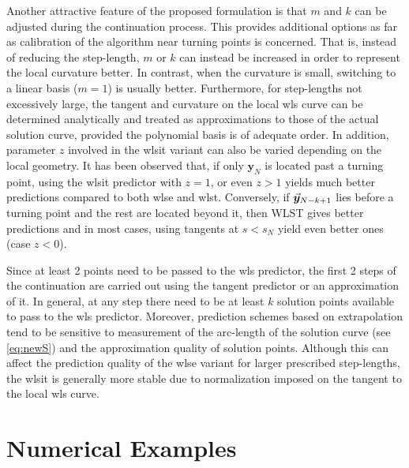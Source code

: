 Another attractive feature of the proposed formulation is that $m$ and $k$ can
be adjusted during the continuation process. This provides additional options 
as far as calibration of the algorithm near turning
points is concerned. That is, instead of reducing the step-length, $m$ or $k$
can instead be increased in order to represent the local curvature better. In
contrast, when the curvature is small, switching to a linear basis ($m=1$) is
usually better.
Furthermore, for step-lengths not excessively large, the tangent and curvature 
on the local \acrshort{wls} curve can be determined analytically and treated as
approximations to those of the actual solution curve, provided the polynomial
basis is of adequate order. In addition, parameter $z$ involved in the 
\acrshort{wlsit}
variant can also be varied depending on the local geometry. It has been
observed that, if only $\bm{y}_N$ is located past a 
turning point,
using the \acrshort{wlsit} predictor with $z=1$, or even $z>1$ yields much 
better 
predictions compared
to both \acrshort{wlse} and \acrshort{wlst}. Conversely, if $\vec{\bm{y}}_{N-k+1}$  
lies before a turning
point and the rest are located beyond it, then WLST gives better predictions and
in most cases, using tangents at $s<s_N$ yield even better ones (case $z<0$). 

Since at least 2 points need to be passed to the \acrshort{wls} predictor, the 
first 2
steps of the continuation are carried out using the tangent predictor or an
approximation of it. In general, at any step there need to be at least $k$
solution points available to pass to the \acrshort{wls} predictor. Moreover, 
prediction
schemes based on extrapolation tend to be sensitive to measurement of the
arc-length of the solution curve (see \ref{eq:newS}) and the approximation 
quality of solution points\cite{Lundberg91,Mackens89}. Although this can affect 
the prediction quality of the \acrshort{wlse} variant
for larger prescribed step-lengths, the \acrshort{wlsit} is generally more 
stable due to normalization imposed on the tangent to the local \acrshort{wls} 
curve. 


\section{Numerical Examples}\label{CH5-S4}

